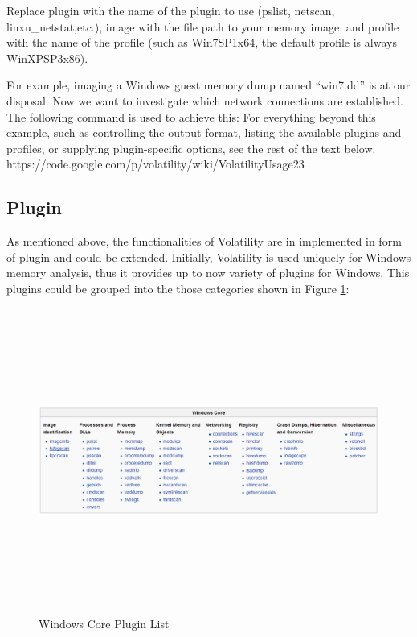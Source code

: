 Replace plugin with the name of the plugin to use (pslist, netscan, linxu\_netstat,etc.), image with the file path to your memory image, 
and profile with the name of the profile (such as Win7SP1x64, the default profile is always WinXPSP3x86).

For example, imaging a Windows guest memory dump named “win7.dd” is at our disposal. Now we want to investigate which network connections are established.  
The following command is used to achieve this:
For everything beyond this example, such as controlling the output format, listing the available plugins and profiles, or supplying 
plugin-specific options, see the rest of the text below. https://code.google.com/p/volatility/wiki/VolatilityUsage23


\subsection{Plugin}
As mentioned above, the functionalities of Volatility are in implemented in form of plugin and could be extended. Initially, 
Volatility is used uniquely for Windows memory analysis, thus it provides up to now variety of plugins for Windows. This plugins could 
be grouped into the those categories shown in Figure \ref{fig:Windows Core Plugin List}:

\begin{figure}[htbp]
	\centering
		\includegraphics[width=14cm, height= 10cm ]{Figures/Figure23.png}
	\caption[Windows Core Plugin List]{Windows Core Plugin List \cite{Reference13}}
	\label{fig:Windows Core Plugin List}
\end{figure}

